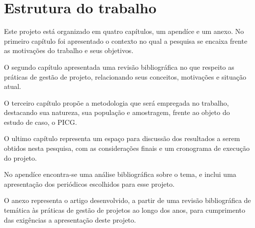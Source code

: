 \section{Estrutura do trabalho}

  Este projeto está organizado em quatro capítulos, um apendíce e um anexo. No primeiro capítulo foi apresentado o contexto no qual a pesquisa se encaixa frente as motivações do trabalho e seus objetivos.

  O segundo capítulo apresentada uma revisão bibliográfica no que respeito as práticas de gestão de projeto, relacionando seus conceitos, motivações e situação atual.

  O terceiro capítulo propõe a metodologia que será empregada no trabalho, destacando sua natureza, sua população e amostragem, frente ao objeto do estudo de caso, o PICG.

  O ultimo capítulo representa um espaço para discussão dos resultados a serem obtidos nesta pesquisa, com as considerações finais e um cronograma de execução do projeto.

  No apendíce encontra-se uma análise bibliográfica sobre o tema, e inclui uma apresentação dos periódicos escolhidos para esse projeto.

  O anexo representa o artigo desenvolvido, a partir de uma revisão bibliográfica de temática às práticas de gestão de projetos ao longo dos anos, para cumprimento das exigências a apresentação deste projeto.

